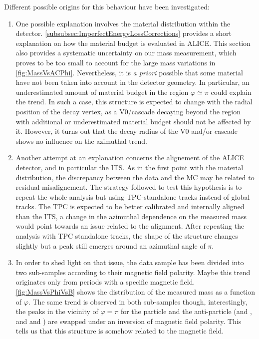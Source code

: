 Different possible origins for this  behaviour have been investigated:
\begin{enumerate}
\item One possible explanation involves the material distribution within the detector. \Sec\ref{subsubsec:ImperfectEnergyLossCorrections} provides a short explanation on how the material budget is evaluated in ALICE. This section also provides a systematic uncertainty on our mass measurement, which proves to be too small to account for the large mass variations in \figs\ref{fig:MassVsACPhi}. Nevertheless, it is \textit{a priori} possible that some material have not been taken into account in the detector geometry. In particular, an underestimated amount of material budget in the region $\varphi \simeq \pi$ could explain the trend. In such a case, this structure is expected to change with the radial position of the decay vertex, as a V0/cascade decaying beyond the region with additional or underestimated material budget should not be affected by it. However, it turns out that the decay radius of the V0 and/or cascade shows no influence on the azimuthal trend.
\item Another attempt at an explanation concerns the alignement of the ALICE detector, and in particular the ITS. As in the first point with the material distribution, the discrepancy between the data and the MC may be related to residual misalignement. The strategy followed to test this hypothesis is to repeat the whole analysis but using TPC-standalone tracks instead of global tracks. The TPC is expected to be better calibrated and internally aligned than the ITS, a change in the azimuthal dependence on the measured mass would point towards an issue related to the alignment. After repeating the analysis with TPC standalone tracks, the shape of the structure changes slightly but a peak still emerges around an azimuthal angle of $\pi$.
\item In order to shed light on that issue, the data sample has been divided into two sub-samples according to their magnetic field polarity. Maybe this trend originates only from periods with a specific magnetic field. \Fig\ref{fig:MassVsPhiVsB} shows the distribution of the measured mass as a function of $\varphi$. The same trend is observed in both sub-samples though, interestingly, the peaks in the vicinity of $\varphi = \pi$  for the particle and the anti-particle (\rmLambda and \rmAlambda, and \rmXiM and \rmAxiP) are swapped under an inversion of magnetic field polarity. This tells us that this structure is somehow related to the magnetic field.

\end{enumerate}
